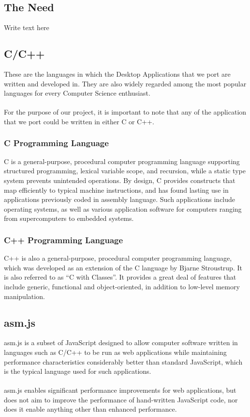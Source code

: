 \documentclass[12pt]{article}
\begin{document}
\subsection{The Need}
Write text here

\pagebreak

\subsection{C/C++}
These are the languages in which the Desktop Applications that we port are written and developed in. They are also widely regarded among the most popular languages for every Computer Science enthusiast. 
\\ 
\\
For the purpose of our project, it is important to note that any of the application that we port could be written in either C or C++. 

\subsubsection{C Programming Language}
C is a general-purpose, procedural computer programming language supporting structured programming, lexical variable scope, and recursion, while a static type system prevents unintended operations. By design, C provides constructs that map efficiently to typical machine instructions, and has found lasting use in applications previously coded in assembly language. Such applications include operating systems, as well as various application software for computers ranging from supercomputers to embedded systems. \cite{CDef}

\subsubsection{C++ Programming Language}
C++ is also a general-purpose, procedural computer programming language, which was developed as an extension of the C language by Bjarne Stroustrup. It is also referred to as “C with Classes”. It provides a great deal of features that include generic, functional and object-oriented, in addition to low-level memory manipulation.\\

\subsection{asm.js}
asm.js is a subset of JavaScript designed to allow computer software written in languages such as C/C++ to be run as web applications while maintaining performance characteristics considerably better than standard JavaScript, which is the typical language used for such applications. 
\\
\\
asm.js enables significant performance improvements for web applications, but does not aim to improve the performance of hand-written JavaScript code, nor does it enable anything other than enhanced performance. \cite{AsmInfo}
\end{document}
